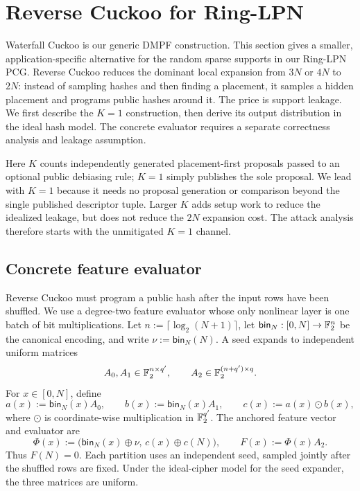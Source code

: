 \section{Reverse Cuckoo for Ring-LPN}
\label{sec:revCuckoo}

Waterfall Cuckoo is our generic DMPF construction.  This section gives a
smaller, application-specific alternative for the random sparse supports in
our Ring-LPN PCG.  Reverse Cuckoo reduces the dominant local expansion from
$3N$ or $4N$ to $2N$: instead of sampling hashes and then finding a placement,
it samples a hidden placement and programs public hashes around it.  The price
is support leakage. We first describe the $K=1$ construction, then derive
its output distribution in the ideal hash model. The concrete evaluator
requires a separate correctness analysis and leakage assumption.

Here $K$ counts independently generated placement-first proposals passed to an
optional public debiasing rule; $K=1$ simply publishes the sole proposal.  We
lead with $K=1$ because it needs no proposal generation or comparison beyond
the single published descriptor tuple. Larger $K$ adds setup work to reduce
the idealized leakage, but does not reduce the $2N$ expansion cost.
The attack analysis therefore starts with the unmitigated $K=1$ channel.

\subsection{Concrete feature evaluator}\label{sec:hash}

Reverse Cuckoo must program a public hash after the input rows have been
shuffled.  We use a degree-two feature evaluator whose only nonlinear layer is
one batch of bit multiplications.  Let
$n:=\lceil\log_2(N+1)\rceil$, let
$\mathsf{bin}_N:[0,N]\rightarrow\mathbb{F}_2^n$ be the canonical encoding, and write
$\nu:=\mathsf{bin}_N(N)$.  A seed expands to independent uniform matrices
\[
 A_0,A_1\in\mathbb{F}_2^{n\times q'},
 \qquad
 A_2\in\mathbb{F}_2^{(n+q')\times q}.
\]
For $x\in[0,N]$, define
\[
 a(x):=\mathsf{bin}_N(x)A_0,
 \qquad
 b(x):=\mathsf{bin}_N(x)A_1,
 \qquad
 c(x):=a(x)\odot b(x),
\]
where $\odot$ is coordinate-wise multiplication in $\mathbb{F}_2^{q'}$.  The
anchored feature vector and evaluator are
\begin{equation}\label{eq:rc-concrete-feature}
 \Phi(x):=\bigl(\mathsf{bin}_N(x)\oplus\nu,\,
                  c(x)\oplus c(N)\bigr),
 \qquad
 F(x):=\Phi(x)A_2.
\end{equation}
Thus $F(N)=0$.  Each partition uses an independent seed, sampled jointly
after the shuffled rows are fixed.  Under the ideal-cipher model for the
seed expander, the three matrices are uniform.

